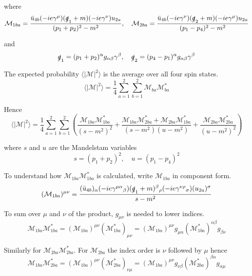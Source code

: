where
\begin{equation*}
\mathcal M_{1ba}=
\frac{\bar{u}_{4b}(-ie\gamma^\mu)(\slashed{q}_1+m)(-ie\gamma^\nu)u_{2a}}{(p_1+p_2)^2-m^2},
\quad
\mathcal M_{2ba}=
\frac{\bar{u}_{4b}(-ie\gamma^\nu)(\slashed{q}_2+m)(-ie\gamma^\mu)u_{2a}}{(p_1-p_4)^2-m^2}
\end{equation*}

and
\begin{equation*}
\slashed q_1=(p_1+p_2)^\alpha g_{\alpha\beta}\gamma^\beta,
\quad
\slashed q_2=(p_4-p_1)^\alpha g_{\alpha\beta}\gamma^\beta
\end{equation*}

The expected probability $\langle|\mathcal M|^2\rangle$ is the average over all four spin states.
\begin{equation*}
\langle|\mathcal M|^2\rangle=\frac{1}{4}\sum_{a=1}^2\sum_{b=1}^2\mathcal M_{ba}\mathcal M_{ba}^*
\end{equation*}

Hence
\begin{equation*}
\langle|\mathcal{M}|^2\rangle
=\frac{1}{4}\sum_{a=1}^2\sum_{b=1}^2
\left(
\frac{\mathcal M_{1ba}\mathcal M_{1ba}^*}{(s-m^2)^2}
+\frac{\mathcal M_{1ba}\mathcal M_{2ba}^*+\mathcal M_{2ba}\mathcal M_{1ba}^*}{(s-m^2)(u-m^2)}
+\frac{\mathcal M_{2ba}\mathcal M_{2ba}^*}{(u-m^2)^2}
\right)
\end{equation*}

where $s$ and $u$ are the Mandelstam variables
\begin{equation*}
s=(p_1+p_2)^2,\quad u=(p_1-p_4)^2
\end{equation*}

To understand how $\mathcal M_{1ba}\mathcal M_{1ba}^*$ is calculated,
write $\mathcal M_{1ba}$ in component form.
\begin{equation*}
(\mathcal M_{1ba})^{\mu\nu}=\frac{
(\bar{u}_{4b})_\alpha
(-ie\gamma^{\mu\alpha}{}_\beta)
(\slashed{q}_1+m)^\beta{}_\rho
(-ie\gamma^{\nu\rho}{}_\sigma)
(u_{2a})^\sigma}{s-m^2}
\end{equation*}

To sum over $\mu$ and $\nu$ of the product, $g_{\mu\nu}$ is needed to lower indices.
\begin{equation*}
\mathcal M_{1ba}\mathcal M_{1ba}^*=(\mathcal M_{1ba})^{\mu\nu}(\mathcal M_{1ba}^*)_{\mu\nu}
=(\mathcal M_{1ba})^{\mu\nu}g_{\mu\alpha}(\mathcal M_{1ba}^*)^{\alpha\beta}g_{\beta\nu}
\end{equation*}

Similarly for $\mathcal M_{2ba}\mathcal M_{2ba}^*$.
For $\mathcal M_{2ba}$ the index order is $\nu$ followed by $\mu$ hence
\begin{equation*}
\mathcal M_{1ba}\mathcal M_{2ba}^*=(\mathcal M_{1ba})^{\mu\nu}(\mathcal M_{2ba}^*)_{\nu\mu}
=(\mathcal M_{1ba})^{\mu\nu}g_{\nu\beta}(\mathcal M_{2ba}^*)^{\beta\alpha}g_{\alpha\mu}
\end{equation*}

